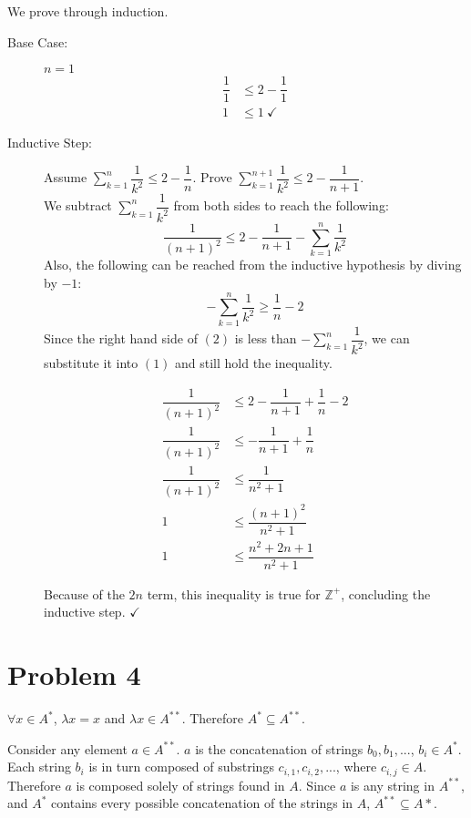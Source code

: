 \documentclass[11pt]{article}
\begin{document}
We prove through induction.
\begin{description}
	\item[Base Case:] $n= 1$
		\begin{align*}
				\dfrac{1}{1} &\leq 2 - \dfrac{1}{1}\\
				1 &\leq 1\ \checkmark
		\end{align*}
		
	\item[Inductive Step:] Assume $\sum\limits_{k=1}^n \dfrac{1}{k^2} \leq 2 - \dfrac{1}{n}$. Prove $\sum\limits_{k=1}^{n+1} \dfrac{1}{k^2} \leq 2 - \dfrac{1}{n+1}$. \\
	We subtract $\sum\limits_{k=1}^{n} \dfrac{1}{k^2}$ from both sides to reach the following:
		\begin{equation}
		\dfrac{1}{(n+1)^2} \leq 2 - \dfrac{1}{n+1} - \sum\limits_{k=1}^{n} \dfrac{1}{k^2}
		\end{equation}
		Also, the following can be reached from the inductive hypothesis by diving by $-1$:
		\begin{equation*}
		-\sum\limits_{k=1}^n \dfrac{1}{k^2} \geq \dfrac{1}{n} -2
		\end{equation*}
		Since the right hand side of $(2)$ is less than $-\sum\limits_{k=1}^n \dfrac{1}{k^2}$, we can substitute it into $(1)$ and still hold the inequality.
		
	\begin{align*}
	\dfrac{1}{(n+1)^2} &\leq 2 - \dfrac{1}{n+1} + \dfrac{1}{n} -2 \\
	\dfrac{1}{(n+1)^2} &\leq - \dfrac{1}{n+1} + \dfrac{1}{n}	\\
	\dfrac{1}{(n+1)^2} &\leq \dfrac{1}{n^2 +1}\\
	1 &\leq \dfrac{(n+1)^2}{n^2 +1}\\
	1 &\leq \dfrac{n^2 + 2n + 1}{n^2 + 1}
	\end{align*}
	
	Because of the $2n$ term, this inequality is true for $\mathbb{Z^+}$, concluding the inductive step. $\checkmark$


\end{description}

\section*{Problem 4}

$\forall x \in A^*$, $\lambda x = x$ and $ \lambda x \in A^{**}$. Therefore $A^* \subseteq A^{**}$.

Consider any element $a \in A^{**}$. $a$ is the concatenation of strings $b_0, b_1,...$, $b_i \in A^*$. Each string $b_i$ is in turn composed of substrings $c_{i,1}, c_{i,2}, ...$, where $c_{i,j} \in A$. Therefore $a$ is composed solely of strings found in $A$. Since $a$ is any string in $A^{**}$, and $A^*$ contains every possible concatenation of the strings in $A$, $A^{**} \subseteq A*$.
\end{document}
